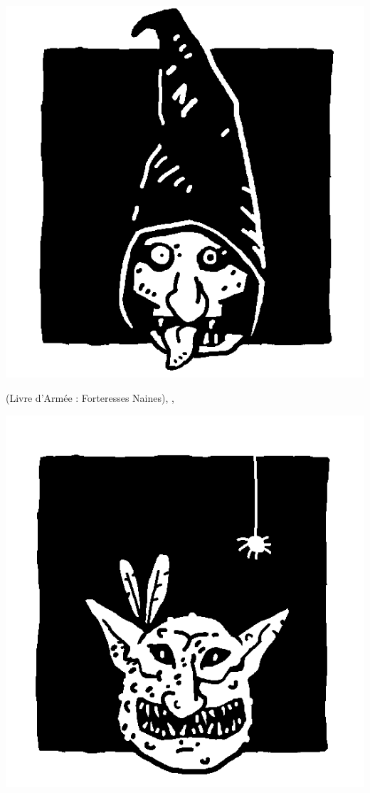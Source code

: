 \begin{multicols}{3}
\begin{center}
\includegraphics[width=\logosize]{pics/cavegoblin.png}
\vspace*{-1cm}\subsubtitle{\cavegoblin}

\hatred{} (Livre d'Armée : Forteresses Naines), \unruly{}, \insignificant{}
\end{center}

\columnbreak

\begin{center}
\includegraphics[width=\logosize]{pics/forestgoblin.png}
\vspace*{-1cm}\subsubtitle{\forestgoblin}


\end{center}
\end{multicols}
